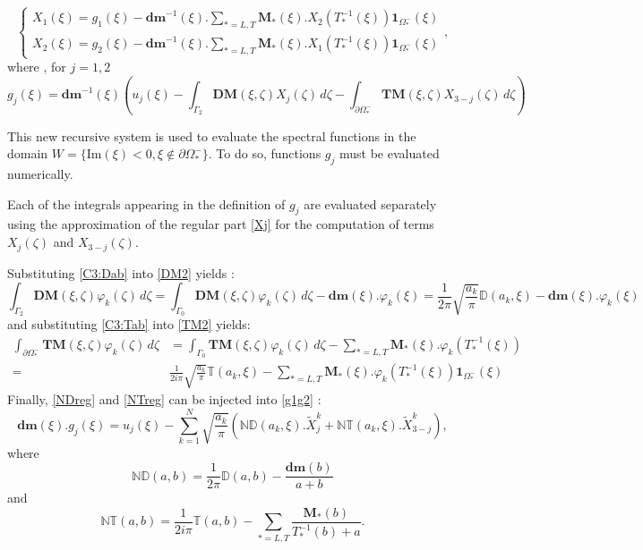 \begin{equation}
\left\{
\begin{matrix}
X_1(\xi) =g_1(\xi)-\textbf{dm}^{-1}(\xi).\underset{*=L,T}{\sum} \mathbf{M}_*(\xi).X_2(T_*^{-1}(\xi))\textbf{1}_{\Omega_*^-}(\xi) \\
X_2(\xi) =g_2(\xi)-\textbf{dm}^{-1}(\xi).\underset{*=L,T}{\sum} \mathbf{M}_*(\xi).X_1(T_*^{-1}(\xi))\textbf{1}_{\Omega_*^-}(\xi)
\end{matrix}
\right.,
\label{recur}
\end{equation}
where , for $j=1,2$
\begin{equation}
g_j(\xi)=\textbf{dm}^{-1}(\xi)\left( u_j(\xi)- \int_{\Gamma_2}  \textbf{DM}(\xi,\zeta)X_j(\zeta)\, d\zeta- \int_{\partial \Omega_*^-}  \textbf{TM}(\xi,\zeta)X_{3-j}(\zeta)\, d\zeta \right) 
\label{g1g2}
\end{equation}

This new recursive system is used to evaluate the spectral functions in the domain $W=\{ \mbox{Im}(\xi)<0, \xi \notin \partial \Omega_*^- \}$. To do so, functions $g_j$ must be evaluated numerically.

Each of the integrals appearing in the definition of $g_j$ are evaluated separately using the approximation of the regular part \eqref{Xj} for the computation of terms $X_j(\zeta)$ and $X_{3-j}(\zeta)$. 

Substituting \eqref{C3:Dab} into \eqref{DM2} yields :
\begin{equation}
\int_{\Gamma_2}\textbf{DM}(\xi,\zeta)\varphi_k(\zeta) \, d\zeta = \int_{\Gamma_0}\textbf{DM}(\xi,\zeta)\varphi_k(\zeta)\, d\zeta -\textbf{dm}(\xi).\varphi_k(\xi)=\frac{1}{2\pi}\sqrt{\frac{a_k}{\pi}} \mathbb{D}(a_k,\xi)-\textbf{dm}(\xi).\varphi_k(\xi) 
\label{NDreg}
\end{equation}
and substituting \eqref{C3:Tab} into \eqref{TM2} yields:
\begin{equation}
\begin{split}
\int_{\partial \Omega_*^-}  \textbf{TM}(\xi,\zeta)\varphi_k(\zeta)\, d\zeta&=\int_{\Gamma_0} \textbf{TM}(\xi,\zeta)\varphi_k(\zeta)\, d\zeta  -\sum_{*=L,T} \mathbf{M}_*(\xi).\varphi_k(T^{-1}_*(\xi)) \\
= &\frac{1}{2i\pi} \sqrt{\frac{a_k}{\pi}} \mathbb{T}(a_k,\xi)- \sum_{*=L,T}\mathbf{M}_*(\xi).\varphi_k(T^{-1}_*(\xi))\textbf{1}_{\Omega_*^-}(\xi)
\end{split}
\label{NTreg}
\end{equation}
Finally, \eqref{NDreg} and \eqref{NTreg} can be injected into \eqref{g1g2} :
\begin{equation}
\textbf{dm}(\xi).g_j(\xi)=u_j(\xi)-\sum_{k=1}^N \sqrt{\frac{a_k}{\pi}}\left( \mathbb{ND}(a_k,\xi).\tilde{X}_j^k+\mathbb{NT}(a_k,\xi).\tilde{X}_{3-j}^k \right) ,
\label{gjfinal}
\end{equation}
where
\begin{equation}
\mathbb{ND}(a,b)=\frac{1}{2\pi}\mathbb{D}(a,b)-\frac{\textbf{dm}(b)}{a+b}
\label{defND}
\end{equation}
and
\begin{equation}
\mathbb{NT}(a,b)=\frac{1}{2i\pi}\mathbb{T}(a,b)-\sum_{*=L,T}\frac{\mathbf{M}_*(b)}{T^{-1}_*(b)+a} .
\end{equation}

